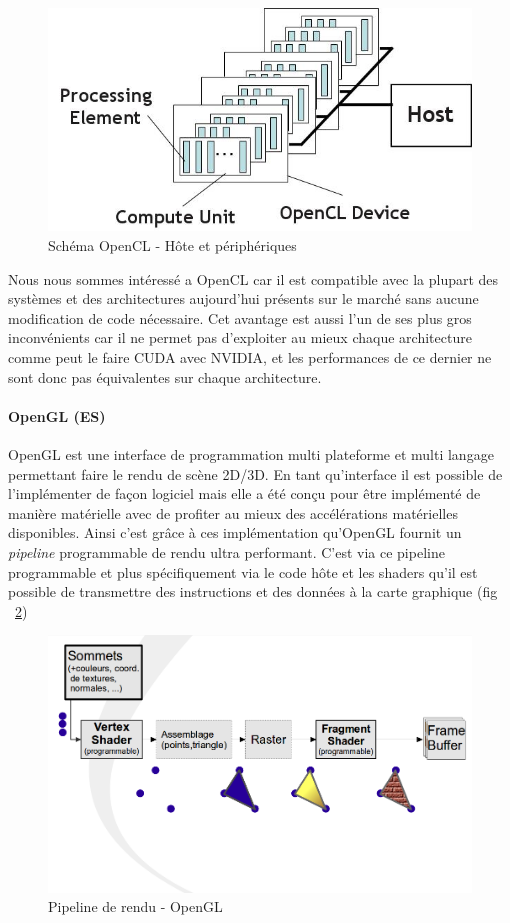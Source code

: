 \begin{figure}[H]
\centering
\includegraphics[width=0.5\linewidth]{images/opencl}
\caption{Schéma OpenCL - Hôte et périphériques\protect\footnotemark}
\label{fig:opencl}
\end{figure}


Nous nous sommes intéressé a OpenCL car il est compatible avec la plupart des systèmes et des architectures aujourd'hui présents sur le marché sans aucune modification de code nécessaire. Cet avantage est aussi l'un de ses plus gros inconvénients car il ne permet pas d'exploiter au mieux chaque architecture comme peut le faire CUDA avec NVIDIA, et les performances de ce dernier ne sont donc pas équivalentes sur chaque architecture. %

\paragraph{OpenGL (ES)} 
OpenGL est une interface de programmation multi plateforme et multi langage permettant faire le rendu de scène 2D/3D. En tant qu'interface il est possible de l'implémenter de façon logiciel mais elle a été conçu pour être implémenté de manière matérielle avec de profiter au mieux des accélérations matérielles disponibles. Ainsi c'est grâce à ces implémentation qu'OpenGL fournit un \emph{pipeline} programmable de rendu ultra performant. C'est via ce pipeline programmable et plus spécifiquement via le code hôte et les shaders qu'il est possible de transmettre des instructions et des données à la carte graphique (fig ~\ref{fig:opengl:pipeline})

\begin{figure}[H]
\centering
\includegraphics[width=0.7\linewidth]{images/opengl-pipeline}
\caption{Pipeline de rendu - OpenGL\protect\footnotemark}
\label{fig:opengl:pipeline}
\end{figure}

